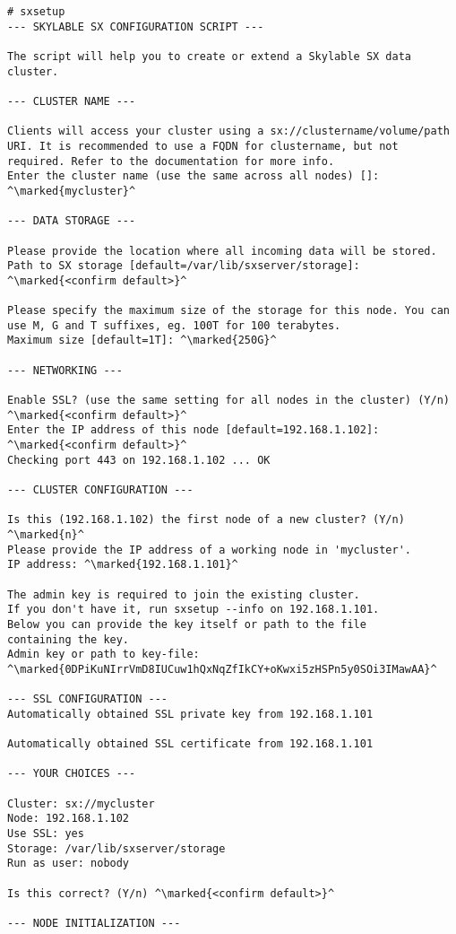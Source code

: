 \begin{lstlisting}
# sxsetup
--- SKYLABLE SX CONFIGURATION SCRIPT ---

The script will help you to create or extend a Skylable SX data
cluster.

--- CLUSTER NAME ---

Clients will access your cluster using a sx://clustername/volume/path
URI. It is recommended to use a FQDN for clustername, but not
required. Refer to the documentation for more info.
Enter the cluster name (use the same across all nodes) []: ^\marked{mycluster}^

--- DATA STORAGE ---

Please provide the location where all incoming data will be stored.
Path to SX storage [default=/var/lib/sxserver/storage]: ^\marked{<confirm default>}^

Please specify the maximum size of the storage for this node. You can
use M, G and T suffixes, eg. 100T for 100 terabytes.
Maximum size [default=1T]: ^\marked{250G}^

--- NETWORKING ---

Enable SSL? (use the same setting for all nodes in the cluster) (Y/n)
^\marked{<confirm default>}^
Enter the IP address of this node [default=192.168.1.102]: ^\marked{<confirm default>}^
Checking port 443 on 192.168.1.102 ... OK

--- CLUSTER CONFIGURATION ---

Is this (192.168.1.102) the first node of a new cluster? (Y/n) ^\marked{n}^
Please provide the IP address of a working node in 'mycluster'.
IP address: ^\marked{192.168.1.101}^

The admin key is required to join the existing cluster.
If you don't have it, run sxsetup --info on 192.168.1.101.
Below you can provide the key itself or path to the file
containing the key.
Admin key or path to key-file:
^\marked{0DPiKuNIrrVmD8IUCuw1hQxNqZfIkCY+oKwxi5zHSPn5y0SOi3IMawAA}^

--- SSL CONFIGURATION ---
Automatically obtained SSL private key from 192.168.1.101

Automatically obtained SSL certificate from 192.168.1.101

--- YOUR CHOICES ---

Cluster: sx://mycluster
Node: 192.168.1.102
Use SSL: yes
Storage: /var/lib/sxserver/storage
Run as user: nobody

Is this correct? (Y/n) ^\marked{<confirm default>}^

--- NODE INITIALIZATION ---


\end{lstlisting}
